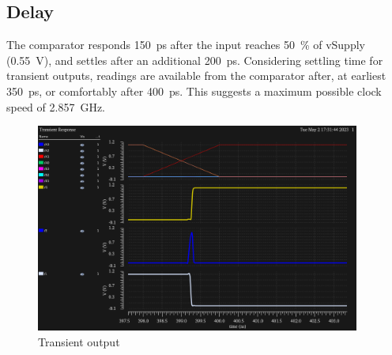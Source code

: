 \subsection{Delay}
The comparator responds \qty{150}{\ps} after the input reaches \qty{50}{\percent} of vSupply (\qty{0.55}{\V}), and 
settles after an additional \qty{200}{\ps}. Considering settling time for transient outputs, readings 
are available from the comparator after, at earliest \qty{350}{\ps}, or comfortably after \qty{400}{\ps}. 
This suggests a maximum possible clock speed of \qty{2.857}{\GHz}.
\begin{figure}[H]
    \centering
    \includegraphics[width=0.95\textwidth]{./figures/comparator/sim-response-layout.png}
    \caption{Transient output}\label{fig:comparatortransient}
\end{figure}
